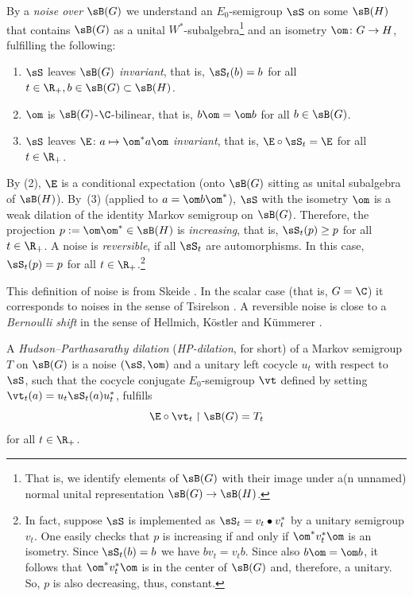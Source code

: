 \bemp \label{noise} By a \emph{noise over $\sB(G)$} we understand an $E_0$-semigroup $\sS$ on some $\sB(H)$ that contains $\sB(G)$ as a unital $W^*$-subalgebra\footnote{That is, we identify elements of $\sB(G)$ with their image under a(n unnamed) normal unital representation $\sB(G)\rightarrow\sB(H)$.}
and an isometry $\om\colon G\rightarrow H$, fulfilling the following:
\begin{enumerate}\itemsep=0pt
\item $\sS$ leaves $\sB(G)$ \emph{invariant}, that is, $\sS_t(b)=b$ for all $t\in\R_+,b\in\sB(G)\subset\sB(H)$.

\item $\om$ is $\sB(G)$-$\C$-bilinear, that is, $b\om=\om b$ for all $b\in\sB(G)$.

\item $\sS$ leaves $\E\colon a\mapsto\om^*a\om$ \emph{invariant}, that is, $\E\circ\sS_t=\E$ for all $t\in\R_+$.
\end{enumerate}
By (2), $\E$ is a conditional expectation (onto $\sB(G)$ sitting as unital subalgebra of $\sB(H)$). By~(3) (applied to $a=\om b\om^*$), $\sS$ with the isometry $\om$ is a weak dilation of the identity Markov semigroup on $\sB(G)$. Therefore, the projection $p:=\om\om^*\in\sB(H)$ is \emph{increasing}, that is, $\sS_t(p)\ge p$ for all $t\in\R_+$. A noise is \emph{reversible}, if all $\sS_t$ are automorphisms. In this case, $\sS_t(p)=p$ for all $t\in\R_+$.\footnote{In fact, suppose $\sS$ is implemented as $\sS_t=v_t\bullet v_t^*$ by a unitary semigroup $v_t$. One easily checks that $p$ is increasing if and only if $\om^*v_t^*\om$ is an isometry. Since $\sS_t(b)=b$ we have $bv_t=v_tb$. Since also $b\om=\om b$, it follows that $\om^*v_t^*\om$ is in the center of $\sB(G)$ and, therefore, a unitary. So, $p$ is also decreasing, thus, constant.\label{revcFN}}
\eemp

\brem This definition of noise is from Skeide \cite{Ske06d}. In the scalar case (that is, $G=\C$) it corresponds to noises in the sense of Tsirelson \cite{Tsi98p1,Tsi03p1}. A reversible noise is close to a {\it Bernoulli shift} in the sense of Hellmich, K\"ostler and K\"ummerer \cite{HKK04p}.
\erem

\bdefi
A \emph{Hudson--Parthasarathy dilation} (\emph{HP-dilation}, for short) of a Markov semigroup $T$ on $\sB(G)$ is a noise $(\sS,\om)$ and a unitary left cocycle $u_t$ with respect to $\sS$, such that the cocycle conjugate $E_0$-semi\-group $\vt$ defined by setting $\vt_t(a)=u_t\sS_t(a)u_t^*$, fulfills
\[
\E\circ\vt_t\upharpoonright\sB(G)=T_t
\]
for all $t\in\R_+$.

